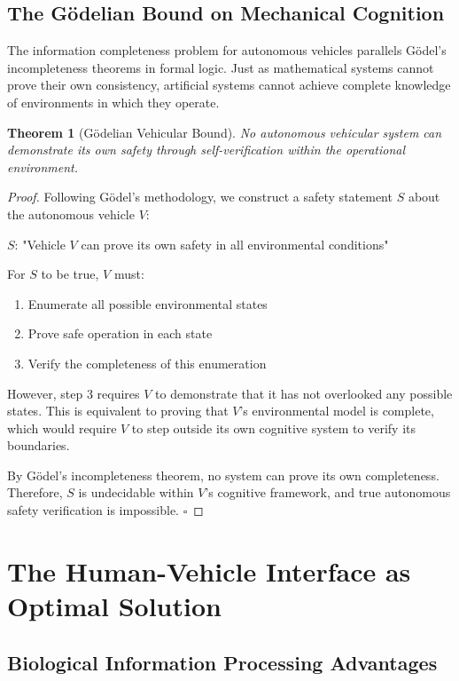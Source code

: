 \documentclass[12pt,a4paper]{article}
\newtheorem{theorem}{Theorem}[section]
\begin{document}
\subsection{The Gödelian Bound on Mechanical Cognition}

The information completeness problem for autonomous vehicles parallels Gödel's incompleteness theorems in formal logic. Just as mathematical systems cannot prove their own consistency, artificial systems cannot achieve complete knowledge of environments in which they operate.

\begin{theorem}[Gödelian Vehicular Bound]
No autonomous vehicular system can demonstrate its own safety through self-verification within the operational environment.
\end{theorem}

\begin{proof}
Following Gödel's methodology, we construct a safety statement $S$ about the autonomous vehicle $V$:

$S$: "Vehicle $V$ can prove its own safety in all environmental conditions"

For $S$ to be true, $V$ must:
\begin{enumerate}
\item Enumerate all possible environmental states
\item Prove safe operation in each state
\item Verify the completeness of this enumeration
\end{enumerate}

However, step 3 requires $V$ to demonstrate that it has not overlooked any possible states. This is equivalent to proving that $V$'s environmental model is complete, which would require $V$ to step outside its own cognitive system to verify its boundaries.

By Gödel's incompleteness theorem, no system can prove its own completeness. Therefore, $S$ is undecidable within $V$'s cognitive framework, and true autonomous safety verification is impossible. $\square$
\end{proof}

\section{The Human-Vehicle Interface as Optimal Solution}

\subsection{Biological Information Processing Advantages}
\end{document}
